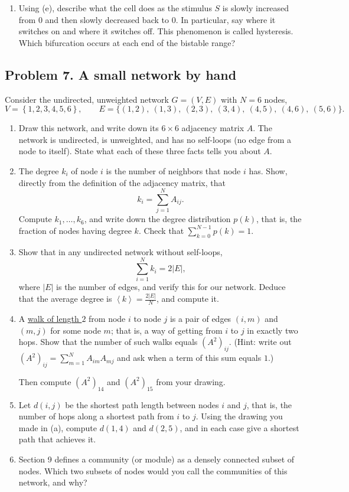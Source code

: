 \documentclass[a4paper,12pt]{article}
\begin{document}
\begin{enumerate}[label=(\alph*)]
\item Using (e), describe what the cell does as the stimulus $S$ is slowly increased from $0$ and then slowly decreased back to $0$. In particular, say where it switches on and where it switches off. This phenomenon is called hysteresis. Which bifurcation occurs at each end of the bistable range?
\end{enumerate}

\subsection*{Problem 7. A small network by hand}

Consider the undirected, unweighted network $G=(V,E)$ with $N=6$ nodes,
\[ V = \left\{ 1,2,3,4,5,6 \right\},
\qquad
E = \Big\{ (1,2),\ (1,3),\ (2,3),\ (3,4),\ (4,5),\ (4,6),\ (5,6) \Big\} . \]

\begin{enumerate}[label=(\alph*)]
\item Draw this network, and write down its $6 \times 6$ adjacency matrix $A$. The network is undirected, is unweighted, and has no self-loops (no edge from a node to itself). State what each of these three facts tells you about $A$.

\item The degree $k_i$ of node $i$ is the number of neighbors that node $i$ has. Show, directly from the definition of the adjacency matrix, that
\[ k_i = \sum_{j=1}^{N} A_{ij} . \]
Compute $k_1, \ldots, k_6$, and write down the degree distribution $p(k)$, that is, the fraction of nodes having degree $k$. Check that $\sum_{k=0}^{N-1} p(k)=1$.

\item Show that in any undirected network without self-loops,
\[ \sum_{i=1}^{N} k_i = 2\left| E \right| , \]
where $\left| E \right|$ is the number of edges, and verify this for our network. Deduce that the average degree is $\left\langle k \right\rangle = \frac{2\left| E \right|}{N}$, and compute it.

\item A \underline{walk of length $2$} from node $i$ to node $j$ is a pair of edges $(i,m)$ and $(m,j)$ for some node $m$; that is, a way of getting from $i$ to $j$ in exactly two hops. Show that the number of such walks equals $\left( A^2 \right)_{ij}$. (Hint: write out $\left( A^2 \right)_{ij} = \sum_{m=1}^{N} A_{im}A_{mj}$ and ask when a term of this sum equals $1$.)

Then compute $\left( A^2 \right)_{14}$ and $\left( A^2 \right)_{15}$ from your drawing.

\item Let $d(i,j)$ be the shortest path length between nodes $i$ and $j$, that is, the number of hops along a shortest path from $i$ to $j$. Using the drawing you made in (a), compute $d(1,4)$ and $d(2,5)$, and in each case give a shortest path that achieves it.

\item Section 9 defines a community (or module) as a densely connected subset of nodes. Which two subsets of nodes would you call the communities of this network, and why?
\end{enumerate}
\end{document}
